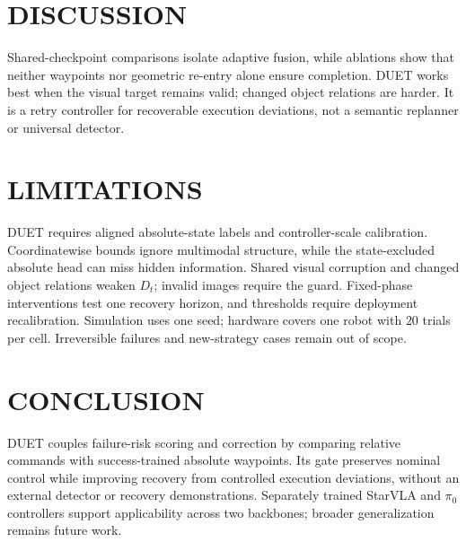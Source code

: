 \documentclass[letterpaper, 10 pt, conference]{ieeeconf}
\begin{document}
\section{DISCUSSION}

Shared-checkpoint comparisons isolate adaptive fusion, while ablations show that neither waypoints nor geometric re-entry alone ensure completion. DUET works best when the visual target remains valid; changed object relations are harder. It is a retry controller for recoverable execution deviations, not a semantic replanner or universal detector.

\section{LIMITATIONS}

DUET requires aligned absolute-state labels and controller-scale calibration. Coordinatewise bounds ignore multimodal structure, while the state-excluded absolute head can miss hidden information. Shared visual corruption and changed object relations weaken $D_t$; invalid images require the guard. Fixed-phase interventions test one recovery horizon, and thresholds require deployment recalibration. Simulation uses one seed; hardware covers one robot with $20$ trials per cell. Irreversible failures and new-strategy cases remain out of scope.

\section{CONCLUSION}

DUET couples failure-risk scoring and correction by comparing relative commands with success-trained absolute waypoints. Its gate preserves nominal control while improving recovery from controlled execution deviations, without an external detector or recovery demonstrations. Separately trained StarVLA and $\pi_0$ controllers support applicability across two backbones; broader generalization remains future work.

\FloatBarrier
\balance


\end{document}
